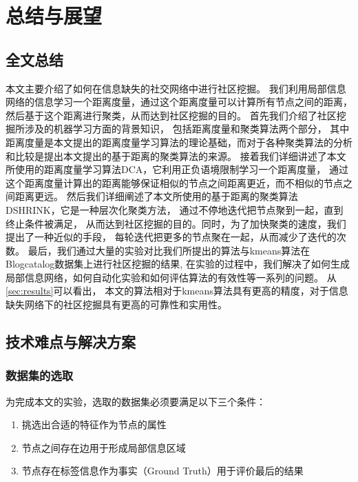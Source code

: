\chapter{总结与展望}
\label{chap:summary}

\section{全文总结}

本文主要介绍了如何在信息缺失的社交网络中进行社区挖掘。
我们利用局部信息网络的信息学习一个距离度量，通过这个距离度量可以计算所有节点之间的距离，
然后基于这个距离进行聚类，从而达到社区挖掘的目的。
首先我们介绍了社区挖掘所涉及的机器学习方面的背景知识，
包括距离度量和聚类算法两个部分，
其中距离度量是本文提出的距离度量学习算法的理论基础，而对于各种聚类算法的分析和比较是提出本文提出的基于距离的聚类算法的来源。
接着我们详细讲述了本文所使用的距离度量学习算法DCA，它利用正负语境限制学习一个距离度量，
通过这个距离度量计算出的距离能够保证相似的节点之间距离更近，而不相似的节点之间距离更远。
然后我们详细阐述了本文所使用的基于距离的聚类算法DSHRINK，它是一种层次化聚类方法，
通过不停地迭代把节点聚到一起，直到终止条件被满足，
从而达到社区挖掘的目的。同时，为了加快聚类的速度，我们提出了一种近似的手段，
每轮迭代把更多的节点聚在一起，从而减少了迭代的次数。
最后，我们通过大量的实验对比我们所提出的算法与kmeans算法在
Blogcatalog数据集上进行社区挖掘的结果,
在实验的过程中，我们解决了如何生成局部信息网络，如何自动化实验和如何评估算法的有效性等一系列的问题。
从\ref{sec:results}可以看出， 本文的算法相对于kmeans算法具有更高的精度，对于信息缺失网络下的社区挖掘具有更高的可靠性和实用性。

\section{技术难点与解决方案}

\subsection{数据集的选取}

为完成本文的实验，选取的数据集必须要满足以下三个条件：

\begin{enumerate}
\item 挑选出合适的特征作为节点的属性
\item 节点之间存在边用于形成局部信息区域
\item 节点存在标签信息作为事实（Ground Truth）用于评价最后的结果
\end{enumerate}

